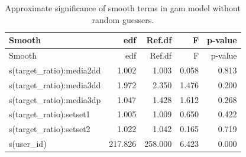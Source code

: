 \documentclass[
  letterpaper,
  DIV=11,
  numbers=noendperiod]{scrartcl}
\begin{document}
\begin{longtable}[]{@{}lrrrr@{}}
\caption{Approximate significance of smooth terms in gam model without
random guessers.}\tabularnewline
\toprule\noalign{}
Smooth & edf & Ref.df & F & p-value \\
\midrule\noalign{}
\endfirsthead
\toprule\noalign{}
Smooth & edf & Ref.df & F & p-value \\
\midrule\noalign{}
\endhead
\bottomrule\noalign{}
\endlastfoot
s(target\_ratio):media2dd & 1.002 & 1.003 & 0.058 & 0.813 \\
s(target\_ratio):media3dd & 1.972 & 2.350 & 1.476 & 0.200 \\
s(target\_ratio):media3dp & 1.047 & 1.428 & 1.612 & 0.268 \\
s(target\_ratio):setset1 & 1.005 & 1.009 & 0.650 & 0.422 \\
s(target\_ratio):setset2 & 1.022 & 1.042 & 0.165 & 0.719 \\
s(user\_id) & 217.826 & 258.000 & 6.423 & 0.000 \\
\end{longtable}
\end{document}
